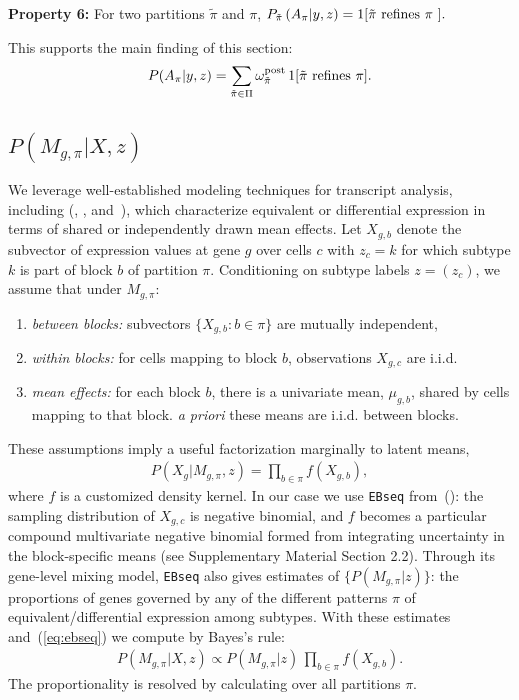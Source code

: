 \documentclass[aoas,preprint]{imsart}
\begin{document}
\noindent
{\bf Property 6:} For two partitions $\tilde \pi$ and $\pi$,  
$P_{\tilde \pi}\left( A_{\pi} | y,z \right) = 1[ {\mbox {\rm $\tilde \pi$ refines $\pi$ }}].$

This supports the main finding of this section:
\begin{eqnarray}
\label{eq:mainfinding}
P(A_\pi|y,z) = 
\sum_{\tilde \pi \in \Pi} \omega^{\rm post}_{\tilde \pi} \,  1[ {\mbox {\rm $\tilde \pi$ refines $\pi$}} ].
\end{eqnarray}


\subsection{$P(M_{g,\pi}|X,z)$}
We leverage well-established modeling techniques for transcript analysis, including
(\cite{ref:Leng}, \cite{Kendziorski:2003aa}, and~\cite{Jensen:2009aa}), which characterize
 equivalent or differential expression in terms of shared or independently drawn mean effects.  Let
$X_{g,b}$ denote
the subvector of expression values at gene $g$ over cells $c$ with $z_c=k$ for which subtype $k$ is part of
 block $b$ of partition $\pi$.  Conditioning on subtype labels $z=(z_c)$,  we assume that under $M_{g, \pi}$: 
\begin{enumerate}
\item {\em between blocks:} subvectors $\{ X_{g,b}: b \in \pi \}$ are mutually independent,
\item {\em within blocks:} for cells mapping to block $b$, observations $X_{g,c}$ are i.i.d. 
\item {\em mean effects:}  for each block $b$, there is a univariate mean,  $\mu_{g,b}$, 
 shared by cells mapping to that block.  {\em a priori} these means are i.i.d.  between blocks.
\end{enumerate}
These assumptions imply a useful factorization marginally to latent means,
\begin{eqnarray}
\label{eq:ebseq}
P(X_g|M_{g,\pi}, z) = \prod_{b \in \pi} f(X_{g,b}),
\end{eqnarray}
where $f$ is a customized density kernel.  In our case we use \verb+EBseq+ from~(\cite{ref:Leng}): 
the sampling distribution of
 $X_{g,c}$ is negative binomial, and $f$ becomes a particular compound multivariate 
negative binomial formed from integrating
uncertainty in the block-specific means (see Supplementary Material Section 2.2).  
Through its gene-level mixing model,
\verb+EBseq+ also gives estimates of $\{ P(M_{g,\pi}|z) \}$: the proportions of genes governed by any of the 
different patterns $\pi$ of equivalent/differential expression among subtypes. With these estimates 
and~(\ref{eq:ebseq}) we compute by Bayes's rule:
\begin{eqnarray*}
P(M_{g,\pi}|X,z) \propto P(M_{g,\pi}|z) \, \prod_{b \in \pi} f(X_{g,b}).
\end{eqnarray*}
The proportionality is resolved by calculating over all partitions $\pi$.
\end{document}
